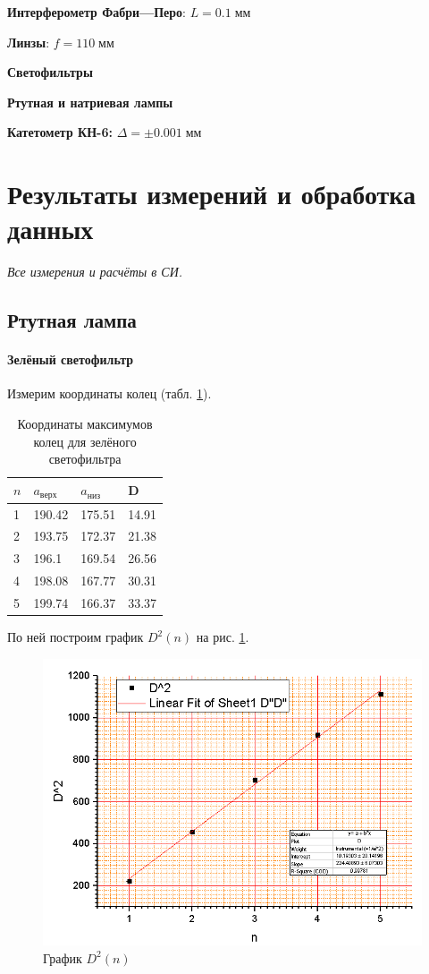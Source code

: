 \documentclass[a4paper]{article}
\newcommand{\Equip}[3]{
	
	{\bf #1:} $\Delta = \pm #2\; #3$}
\newcommand{\equip}[1]{
	
	{\bf #1}}
\begin{document}
\equip{Интерферометр Фабри---Перо}: $ L = 0.1\; мм $
\equip{Линзы}: $ f = 110\; мм $
\equip{Светофильтры}
\equip{Ртутная и натриевая лампы}
\Equip{Катетометр КН-6}{0.001}{мм}

\section{Результаты измерений и обработка данных}
\emph{Все измерения и расчёты в СИ.}

\subsection{Ртутная лампа}

\paragraph{Зелёный светофильтр}

Измерим координаты колец (табл. \ref{tab:greendata}).

\begin{table}[h]
	\centering
	\begin{tabular}{|l|l|l|l|}
		\hline
		$ n $ & $a_{верх} $ & $a_{низ}$ & D     \\ \hline
		1     & 190.42      & 175.51    & 14.91 \\ \hline
		2     & 193.75      & 172.37    & 21.38 \\ \hline
		3     & 196.1       & 169.54    & 26.56 \\ \hline
		4     & 198.08      & 167.77    & 30.31 \\ \hline
		5     & 199.74      & 166.37    & 33.37 \\ \hline
	\end{tabular}
	\caption{Координаты максимумов колец для зелёного светофильтра}
	\label{tab:greendata}
\end{table}

По ней построим график $ D^2(n) $ на рис. \ref{fig:screenshot5}.

\begin{figure}[]
	\centering
	\includegraphics[width=0.8\linewidth]{Screenshot_5}
	\caption{График $D^2(n)$}
	\label{fig:screenshot5}
\end{figure}
\end{document}
